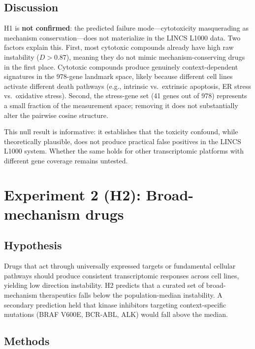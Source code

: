 \documentclass[11pt]{article}
\begin{document}
\subsection{Discussion}

H1 is \textbf{not confirmed}: the predicted failure mode---cytotoxicity
masquerading as mechanism conservation---does not materialize in the
LINCS L1000 data.  Two factors explain this.  First, most cytotoxic
compounds already have high raw instability ($D > 0.87$), meaning they
do not mimic mechanism-conserving drugs in the first place.  Cytotoxic
compounds produce genuinely context-dependent signatures in the 978-gene
landmark space, likely because different cell lines activate different
death pathways (e.g., intrinsic vs.\ extrinsic apoptosis, ER stress
vs.\ oxidative stress).  Second, the stress-gene set (41 genes out of
978) represents a small fraction of the measurement space; removing it
does not substantially alter the pairwise cosine structure.

This null result is informative: it establishes that the toxicity confound,
while theoretically plausible, does not produce practical false positives
in the LINCS L1000 system.  Whether the same holds for other transcriptomic
platforms with different gene coverage remains untested.

\section{Experiment 2 (H2): Broad-mechanism drugs}
\label{sec:h2}

\subsection{Hypothesis}

Drugs that act through universally expressed targets or fundamental
cellular pathways should produce consistent transcriptomic responses
across cell lines, yielding low direction instability.  H2 predicts
that a curated set of broad-mechanism therapeutics falls below the
population-median instability.  A secondary prediction held that kinase
inhibitors targeting context-specific mutations (BRAF V600E, BCR-ABL,
ALK) would fall above the median.

\subsection{Methods}
\end{document}
